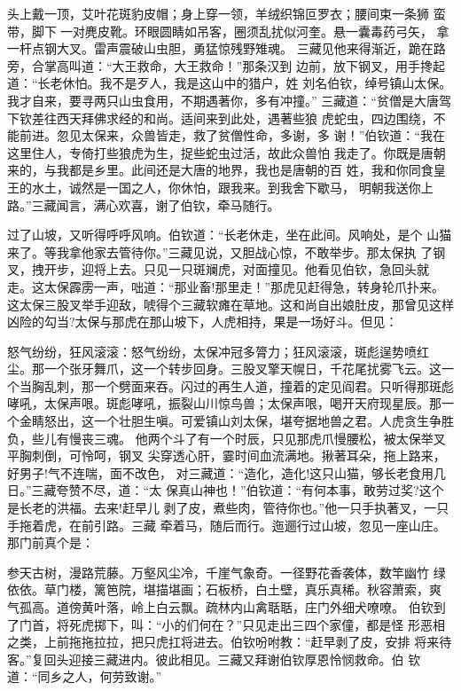 头上戴一顶，艾叶花斑豹皮帽；身上穿一领，羊绒织锦叵罗衣；腰间束一条狮
蛮带，脚下一对麂皮靴。环眼圆睛如吊客，圈须乱扰似河奎。悬一囊毒药弓矢，
拿一杆点钢大叉。雷声震破山虫胆，勇猛惊残野雉魂。
三藏见他来得渐近，跪在路旁，合掌高叫道：“大王救命，大王救命！”那条汉到
边前，放下钢叉，用手搀起道：“长老休怕。我不是歹人，我是这山中的猎户，姓
刘名伯钦，绰号镇山太保。我才自来，要寻两只山虫食用，不期遇著你，多有冲撞。”
三藏道：“贫僧是大唐驾下钦差往西天拜佛求经的和尚。适间来到此处，遇著些狼
虎蛇虫，四边围绕，不能前进。忽见太保来，众兽皆走，救了贫僧性命，多谢，多
谢！”伯钦道：“我在这里住人，专倚打些狼虎为生，捉些蛇虫过活，故此众兽怕
我走了。你既是唐朝来的，与我都是乡里。此间还是大唐的地界，我也是唐朝的百
姓，我和你同食皇王的水土，诚然是一国之人，你休怕，跟我来。到我舍下歇马，
明朝我送你上路。”三藏闻言，满心欢喜，谢了伯钦，牵马随行。

过了山坡，又听得呼呼风响。伯钦道：“长老休走，坐在此间。风响处，是个
山猫来了。等我拿他家去管待你。”三藏见说，又胆战心惊，不敢举步。那太保执
了钢叉，拽开步，迎将上去。只见一只斑斓虎，对面撞见。他看见伯钦，急回头就
走。这太保霹雳一声，咄道：“那业畜!那里走！”那虎见赶得急，转身轮爪扑来。
这太保三股叉举手迎敌，唬得个三藏软瘫在草地。这和尚自出娘肚皮，那曾见这样
凶险的勾当?太保与那虎在那山坡下，人虎相持，果是一场好斗。但见：

怒气纷纷，狂风滚滚：怒气纷纷，太保冲冠多膂力；狂风滚滚，斑彪逞势喷红
尘。那一个张牙舞爪，这一个转步回身。三股叉擎天幌日，千花尾扰雾飞云。这一
个当胸乱刺，那一个劈面来吞。闪过的再生人道，撞着的定见阎君。只听得那斑彪
哮吼，太保声哏。斑彪哮吼，振裂山川惊鸟兽；太保声哏，喝开天府现星辰。那一
个金睛怒出，这一个壮胆生嗔。可爱镇山刘太保，堪夸据地兽之君。人虎贪生争胜
负，些儿有慢丧三魂。
他两个斗了有一个时辰，只见那虎爪慢腰松，被太保举叉平胸刺倒，可怜呵，钢叉
尖穿透心肝，霎时间血流满地。揪著耳朵，拖上路来，好男子!气不连喘，面不改色，
对三藏道：“造化，造化!这只山猫，够长老食用几日。”三藏夸赞不尽，道：“太
保真山神也！”伯钦道：“有何本事，敢劳过奖?这个是长老的洪福。去来!赶早儿
剥了皮，煮些肉，管待你也。”他一只手执著叉，一只手拖着虎，在前引路。三藏
牵着马，随后而行。迤逦行过山坡，忽见一座山庄。那门前真个是：

参天古树，漫路荒藤。万壑风尘冷，千崖气象奇。一径野花香袭体，数竿幽竹
绿依依。草门楼，篱笆院，堪描堪画；石板桥，白土壁，真乐真稀。秋容萧索，爽
气孤高。道傍黄叶落，岭上白云飘。疏林内山禽聒聒，庄门外细犬嘹嘹。
伯钦到了门首，将死虎掷下，叫：“小的们何在？”只见走出三四个家僮，都是怪
形恶相之类，上前拖拖拉拉，把只虎扛将进去。伯钦吩咐教：“赶早剥了皮，安排
将来待客。”复回头迎接三藏进内。彼此相见。三藏又拜谢伯钦厚恩怜悯救命。伯
钦道：“同乡之人，何劳致谢。”

